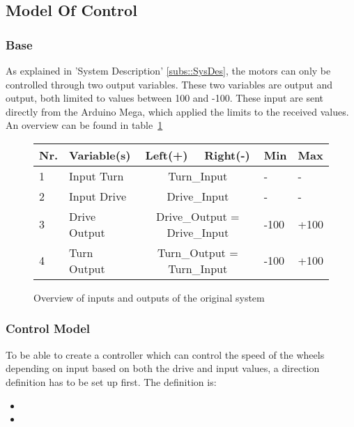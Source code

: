 \subsection{Model Of Control}
\subsubsection{Base}
As explained in 'System Description' \ref{subs::SysDes}, the motors can only be controlled through two output variables.
These two variables are  output and  output, both limited to values between 100 and -100.
These input are sent directly from the Arduino Mega, which applied the limits to the received values.
An overview can be found in table~\ref{tab::varoverview}
\begin{figure}[H]
\begin{tabular}{|l|l|c|c|l|l|}
\hline
\textbf{Nr.} & \textbf{Variable(s)} & \textbf{Left(+)} & \textbf{Right(-)} & \textbf{Min} & \textbf{Max} \\ \hline
1 & Input Turn 	& \multicolumn{2}{c|}{Turn\_Input} 				& - 		& -		\\ \hline
2 & Input Drive 	& \multicolumn{2}{c|}{Drive\_Input} 				& - 		& - 		\\ \hline
3 & Drive Output & \multicolumn{2}{c|}{Drive\_Output = Drive\_Input}	& -100 	& +100 	\\ \hline
4 & Turn Output 	& \multicolumn{2}{c|}{Turn\_Output = Turn\_Input}	& -100	& +100	\\ \hline
\end{tabular}
\caption{Overview of inputs and outputs of the original system}
\label{tab::varoverview}
\end{figure}


\subsubsection{Control Model}
To be able to create a controller which can control the speed of the wheels depending on input based on both the drive and input values, a direction definition has to be set up first.
The definition is:

\begin{itemize}
\item {}
\item {}
\end{itemize}

